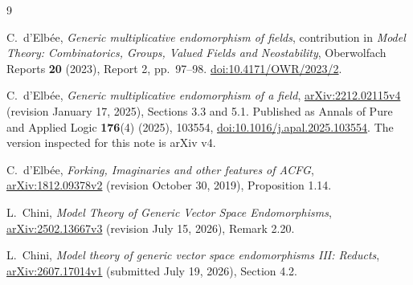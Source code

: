 \documentclass[11pt,a4paper]{article}
\begin{document}
\begin{thebibliography}{9}
\small\raggedright
{} C.~d'Elb\'ee,
\emph{Generic multiplicative endomorphism of fields}, contribution in
\emph{Model Theory: Combinatorics, Groups, Valued Fields and Neostability},
Oberwolfach Reports \textbf{20} (2023), Report 2, pp.~97--98.
\href{https://doi.org/10.4171/OWR/2023/2}{doi:10.4171/OWR/2023/2}.

 C.~d'Elb\'ee,
\emph{Generic multiplicative endomorphism of a field},
\href{https://arxiv.org/abs/2212.02115v4}{arXiv:2212.02115v4}
(revision January 17, 2025), Sections 3.3 and 5.1.
Published as Annals of Pure and Applied Logic \textbf{176}(4) (2025),
103554, \href{https://doi.org/10.1016/j.apal.2025.103554}{doi:10.1016/j.apal.2025.103554}.
The version inspected for this note is arXiv v4.

 C.~d'Elb\'ee,
\emph{Forking, Imaginaries and other features of ACFG},
\href{https://arxiv.org/abs/1812.09378v2}{arXiv:1812.09378v2}
(revision October 30, 2019), Proposition 1.14.

 L.~Chini,
\emph{Model Theory of Generic Vector Space Endomorphisms},
\href{https://arxiv.org/abs/2502.13667v3}{arXiv:2502.13667v3}
(revision July 15, 2026), Remark 2.20.

 L.~Chini,
\emph{Model theory of generic vector space endomorphisms III: Reducts},
\href{https://arxiv.org/abs/2607.17014v1}{arXiv:2607.17014v1}
(submitted July 19, 2026), Section 4.2.
\end{thebibliography}
\end{document}
